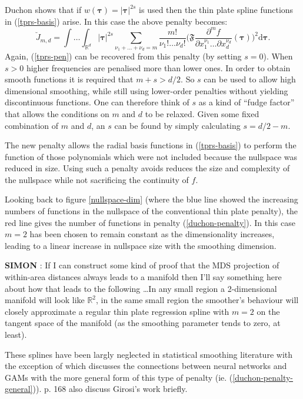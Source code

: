 Duchon shows that if $w(\boldsymbol{\tau})= \lvert \boldsymbol{\tau} \rvert^{2s}$ is used then the thin plate spline functions in (\ref{tprs-basis}) arise. In this case the above penalty becomes:
\begin{equation}
\breve{J}_{m,d} = \int \ldots \int_{\mathbb{R}^d} \lvert \boldsymbol{\tau} \rvert^{2s} \sum_{\nu_1 + \dots + \nu_d=m} \frac{m!}{\nu_1! \dots \nu_d!}\Big( \mathfrak{F} \frac{\partial^m f}{\partial x_1^{\nu_1} \ldots  \partial x_d^{\nu_d}}(\boldsymbol{\tau}) \Big)^2 \text{d} \boldsymbol{\tau}.
\label{duchon-penalty}
\end{equation}
Again, (\ref{tprs-pen}) can be recovered from this penalty (by setting $s=0$). When $s>0$ higher frequencies are penalised more than lower ones. In order to obtain smooth functions it is required that $m+s>d/2$. So $s$ can be used to allow high dimensional smoothing, while still using lower-order penalties without yielding discontinuous functions. One can therefore think of $s$ as a kind of ``fudge factor'' that allows the conditions on $m$ and $d$ to be relaxed. Given some fixed combination of $m$ and $d$, an $s$ can be found by simply calculating $s=d/2-m$.

The new penalty allows the radial basis functions in (\ref{tprs-basis}) to perform the function of those polynomials which were not included because the nullspace was reduced in size. Using such a penalty  avoids reduces the size and complexity of the nullspace while not sacrificing the continuity of $f$. 

Looking back to figure \ref{nullspace-dim} (where the blue line showed the increasing numbers of functions in the nullspace of the conventional thin plate penalty), the red line gives the number of functions in penalty (\ref{duchon-penalty}). In this case $m=2$ has been chosen to remain constant as the dimensionality increases, leading to a linear increase in nullspace size with the smoothing dimension.

\textbf{SIMON} : If I can construct some kind of proof that the MDS projection of within-area distances always leads to a manifold then I'll say something here about how that leads to the following \ldots In any small region a 2-dimensional manifold will look like $\mathbb{R}^2$, in the same small region the smoother's behaviour will closely approximate a regular thin plate regression spline with $m=2$ on the tangent space of the manifold (as the smoothing parameter tends to zero, at least).

These splines have been largly neglected in statistical smoothing literature with the exception of \cite{girosi} which discusses the connections between neural networks and GAMs with the more general form of this type of penalty (ie. (\ref{duchon-penalty-general})). \cite{elements} p. 168 also discuss Girosi's work briefly.

